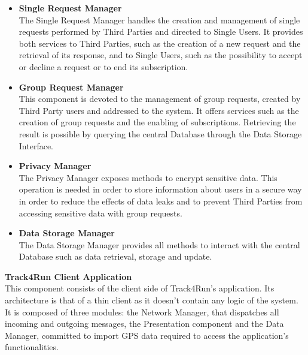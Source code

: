 \documentclass[titlepage]{article}
\begin{document}
\begin{itemize}
		This component is the main gateway between the Client Applications and the central Database. It handles the import of new data associated to a user’s account and its retrieval, as well as organizing it and evaluating statistics before passing it back to the client who requested it.
		\item {\bf Single Request Manager }\\
		The Single Request Manager handles the creation and management of single requests performed by Third Parties and directed to Single Users. It provides both services to Third Parties, such as the creation of a new request and the retrieval of its response, and to Single Users, such as the possibility to accept or decline a request or to end its subscription.
		\item {\bf Group Request Manager }\\
		This component is devoted to the management of group requests, created by Third Party users and addressed to the system. It offers services such as the creation of group requests and the enabling of subscriptions. Retrieving the result is possible by querying the central Database through the Data Storage Interface.
		\item {\bf Privacy Manager }\\
		The Privacy Manager exposes methods to encrypt sensitive data. This operation is needed in order to store information about users in a secure way in order to reduce the effects of data leaks and to prevent Third Parties from accessing sensitive data with group requests. 
		\item {\bf Data Storage Manager }\\
		The Data Storage Manager provides all methods to interact with the central Database such as data retrieval, storage and update.
    \end{itemize} 
    
{\bf Track4Run Client Application }\\ 
This component consists of the client side of Track4Run’s application. Its architecture is that of a thin client as it doesn’t contain any logic of the system. It is composed of three modules: the Network Manager, that dispatches all incoming and outgoing messages, the Presentation component and the Data Manager, committed to import GPS data required to access the application’s functionalities. 
\end{document}
